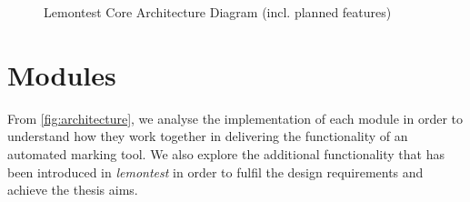 \documentclass[hidelinks]{report}
\begin{document}
\begin{figure}[h]
	\centering
	\caption{Lemontest Core Architecture Diagram (incl. planned features)}
	\label{fig:architecture}
\end{figure}

\clearpage
\section{Modules}\label{modules}
From \autoref{fig:architecture}, we analyse the implementation of each module in order to understand how they work together in delivering the functionality of an automated marking tool. We also explore the additional functionality that has been introduced in \textit{lemontest} in order to fulfil the design requirements and achieve the thesis aims.
\end{document}
